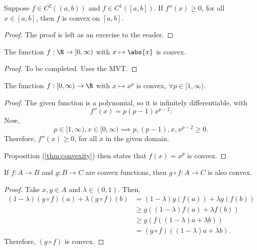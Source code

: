 \documentclass[draft]{penrose}
\begin{document}
\begin{nprop}
\label{thm:convexity}
  Suppose $f \in C^2 ((a,b))$ and $f \in C^1 ([a,b])$. If $f''(x) \geq 0$, for all $x \in [a,b]$, then $f$ is convex on $[a,b]$.
\end{nprop}
\begin{proof}
  The proof is left as an exercise to the reader.
\end{proof}

\begin{nlemma}
  The function $f : \R \to [0,\infty)$ with $x \mapsto \abs{x}$ is convex.
\end{nlemma}
\begin{proof}
  To be completed. Uses the MVT.
\end{proof}

\begin{nlemma}
  The function $f : [0,\infty) \to \R$ with $x \mapsto x^p$ is convex, $\forall p \in [1,\infty)$.
\end{nlemma}
\begin{proof}
  The given function is a polynomial, so it is infinitely differentiable, with
  \begin{equation*}
    f''(x) = p(p-1)x^{p-2}.
  \end{equation*}
  Now,
  \begin{equation*}
    p \in [1,\infty), x \in [0,\infty) \implies p, (p-1), x, x^{p-2} \geq 0.
  \end{equation*}
  Therefore, $f''(x) \geq 0$, for all $x$ in the given domain.

  Proposition (\ref{thm:convexity}) then states that $f(x) = x^p$ is convex.
\end{proof}

\begin{nlemma}
  If $f: A \to B$ and $g: B \to C$ are convex functions, then $g \circ f : A \to C$ is also convex.
\end{nlemma}
\begin{proof}
  Take $x,y \in A$ and $\lambda \in (0,1)$. Then,
  \begin{align*}
  (1-\lambda) (g \circ f)(a) + \lambda (g \circ f)(b)
  &= (1-\lambda) g(f(a)) + \lambda g(f(b))\\
  &\geq g\left((1-\lambda) f(a) + \lambda f(b)\right)\\
  &\geq g\left(f\left((1-\lambda) a + \lambda b\right)\right)\\
  &= (g \circ f)\left((1-\lambda) a + \lambda b\right).
  \end{align*}
  Therefore, $(g \circ f)$ is convex.
\end{proof}
\end{document}
